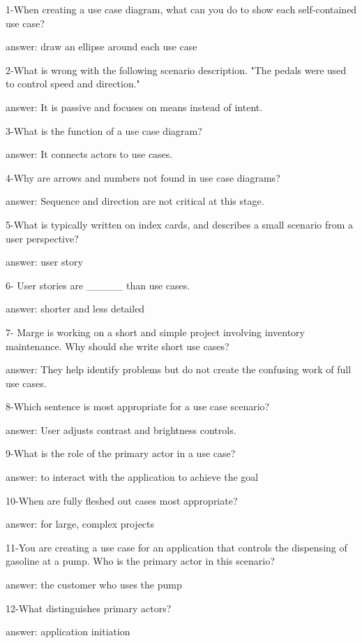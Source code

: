 1-When creating a use case diagram, what can you do to show each self-contained use case?

answer: draw an ellipse around each use case

2-What is wrong with the following scenario description. "The pedals were used to control speed and direction."

answer: It is passive and focuses on means instead of intent.

3-What is the function of a use case diagram?

answer: It connects actors to use cases.

4-Why are arrows and numbers not found in use case diagrams?

answer: Sequence and direction are not critical at this stage.

5-What is typically written on index cards, and describes a small scenario from a user perspective?

answer: user story

6- User stories are _____ than use cases.

answer: shorter and less detailed

7- Marge is working on a short and simple project involving inventory maintenance. Why should she write short use cases?

answer: They help identify problems but do not create the confusing work of full use cases.

8-Which sentence is most appropriate for a use case scenario?

answer: User adjusts contrast and brightness controls.

9-What is the role of the primary actor in a use case?

answer: to interact with the application to achieve the goal

10-When are fully fleshed out cases most appropriate?

answer: for large, complex projects

11-You are creating a use case for an application that controls the dispensing of gasoline at a pump. Who is the primary actor in this scenario?

answer: the customer who uses the pump

12-What distinguishes primary actors?

answer: application initiation
